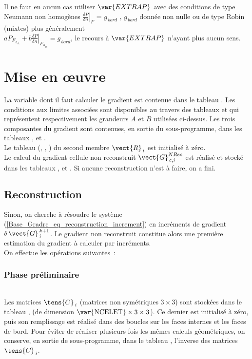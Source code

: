 {Il ne faut en aucun cas utiliser $\var{EXTRAP}$ avec des conditions de type
Neumann non homog\`enes $\left. \displaystyle\frac{\delta P}{\delta
n}\right|_{F}$ = $g_{\,bord}$ , $g_{\,bord}$ donn\'ee non nulle ou de type
Robin (mixtes) plus g\'en\'eralement \\ $a P_{F_{\,b_{\,ik}}} + b \left. \displaystyle\frac{\delta
P}{\delta n}\right|_{F_{\,b_{\,ik}}} = g_{\,bord}$, le recours \`a  $
\var{EXTRAP}$ n'ayant plus aucun sens.

\section*{Mise en \oe uvre}


La variable dont il faut calculer le gradient est contenue dans le tableau
. Les conditions aux limites associ\'ees sont disponibles au travers
des tableaux  et  qui repr\'esentent respectivement les
grandeurs $A$ et $B$ utilis\'ees ci-dessus. Les trois composantes du gradient
sont contenues, en sortie du sous-programme, dans les tableaux ,
 et .\\

Le tableau (, , ) du second membre $\vect{R}_{\,i}$ est initialis\'e \`a
z\'ero.\\
Le calcul du gradient cellule non reconstruit $\vect{G}^{NRec}_{\,c,i}$ est
r\'ealis\'e et stock\'e dans les tableaux ,  et . Si
aucune reconstruction n'est \`a faire, on a fini.\\
\hspace*{1cm}\subsection*{\bf  Reconstruction}
Sinon, on cherche \`a r\'esoudre le syst\`eme (\ref{Base_Gradrc_eq_reconstruction_increment}) en incr\'ements de
gradient ${\delta\,\vect{G}}^{\,k+1}_{\,i}$. Le gradient non reconstruit
constitue alors une premi\`ere estimation du gradient \`a calculer par
incr\'ements.\\
On effectue les op\'erations suivantes~:
\hspace*{1cm}\subsubsection*{\bf Phase pr\'eliminaire}
\hspace*{1,5cm}{\bf Calcul de la matrice, hors boucle en $k$}\\
Les  matrices $\tens{C}_{\,i}$ (matrices non sym\'etriques $3\times 3$) sont
stock\'ees dans le tableau ,
(de dimension $\text{\var{NCELET}}\times 3\times 3$). Ce dernier est initialis\'e \`a z\'ero,
puis son remplissage est r\'ealis\'e dans des boucles sur les faces internes et
les faces de bord. Pour \'eviter de r\'ealiser plusieurs fois les m\^emes
calculs g\'eom\'etriques, on conserve, en sortie de sous-programme, dans le
tableau , l'inverse des  matrices $\tens{C}_{\,i}$.


}
